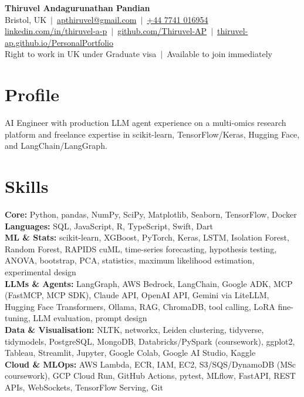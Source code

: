 \documentclass[a4paper,11pt]{article}
\begin{document}
\fontsize{11}{13.2}\selectfont

\begin{center}
  {\LARGE\bfseries Thiruvel Andagurunathan Pandian}\\[3pt]
  Bristol, UK \,$|$\, \href{mailto:apthiruvel@gmail.com}{apthiruvel@gmail.com} \,$|$\, \href{tel:+447741016954}{+44 7741 016954}\\[1pt]
\href{https://www.linkedin.com/in/thiruvel-a-p/}{linkedin.com/in/thiruvel-a-p} \,$|$\, \href{https://github.com/Thiruvel-AP}{github.com/Thiruvel-AP} \,$|$\, \href{https://thiruvel-ap.github.io/PersonalPortfolio/}{thiruvel-ap.github.io/PersonalPortfolio}\\[1pt]
  Right to work in UK under Graduate visa \,$|$\, Available to join immediately
\end{center}

\section{Profile}
AI Engineer with production LLM agent experience on a multi-omics research platform and freelance expertise in scikit-learn, TensorFlow/Keras, Hugging Face, and LangChain/LangGraph.

\section{Skills}
\textbf{Core:} Python, pandas, NumPy, SciPy, Matplotlib, Seaborn, TensorFlow, Docker\\[2pt]
\textbf{Languages:} SQL, JavaScript, R, TypeScript, Swift, Dart\\[2pt]
\textbf{ML \& Stats:} scikit-learn, XGBoost, PyTorch, Keras, LSTM, Isolation Forest, Random Forest, RAPIDS cuML, time-series forecasting, hypothesis testing, ANOVA, bootstrap, PCA, statistics, maximum likelihood estimation, experimental design\\[2pt]
\textbf{LLMs \& Agents:} LangGraph, AWS Bedrock, LangChain, Google ADK, MCP (FastMCP, MCP SDK), Claude API, OpenAI API, Gemini via LiteLLM, Hugging Face Transformers, Ollama, RAG, ChromaDB, tool calling, LoRA fine-tuning, LLM evaluation, prompt design\\[2pt]
\textbf{Data \& Visualisation:} NLTK, networkx, Leiden clustering, tidyverse, tidymodels, PostgreSQL, MongoDB, Databricks/PySpark (coursework), ggplot2, Tableau, Streamlit, Jupyter, Google Colab, Google AI Studio, Kaggle\\[2pt]
\textbf{Cloud \& MLOps:} AWS Lambda, ECR, IAM, EC2, S3/SQS/DynamoDB (MSc coursework), GCP Cloud Run, GitHub Actions, pytest, MLflow, FastAPI, REST APIs, WebSockets, TensorFlow Serving, Git
\end{document}
